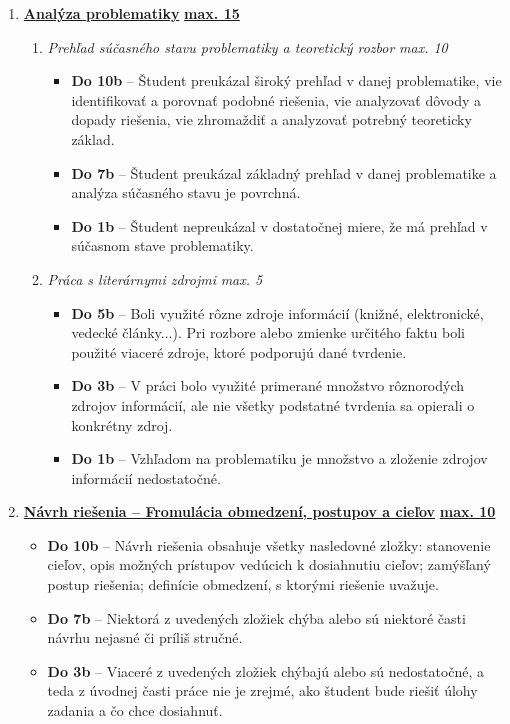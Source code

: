 \begin{enumerate}[label=\textbf{\arabic*.}]
    \item \underline{\textbf{Analýza problematiky}} \hfill \underline{\textbf{max. 15}}
    
    \begin{enumerate}
        \item \textit{Prehľad súčasného stavu problematiky a teoretický rozbor} \hfill \textit{max. 10}
        \begin{itemize}
            \item \textbf{Do 10b} – Študent preukázal široký prehľad v danej problematike, vie identifikovať a porovnať  podobné riešenia, vie analyzovať dôvody a dopady riešenia, vie zhromaždiť a analyzovať potrebný teoreticky základ.  
            \item \textbf{Do 7b} – Študent preukázal základný prehľad v danej problematike a analýza súčasného stavu je povrchná. 
            \item \textbf{Do 1b} – Študent nepreukázal v dostatočnej miere, že má prehľad v súčasnom stave problematiky. 
        \end{itemize}
        
        \item \textit{Práca s literárnymi zdrojmi} \hfill \textit{max. 5}
        \begin{itemize}
            \item \textbf{Do 5b} – Boli využité rôzne zdroje informácií (knižné, elektronické, vedecké články...). Pri rozbore alebo zmienke určitého faktu boli použité viaceré zdroje, ktoré podporujú dané tvrdenie. 
            \item \textbf{Do 3b} – V práci bolo využité primerané množstvo rôznorodých zdrojov informácií, ale nie všetky podstatné tvrdenia sa opierali o konkrétny zdroj. 
            \item \textbf{Do 1b} – Vzhľadom na problematiku je množstvo a zloženie zdrojov informácií nedostatočné. 
        \end{itemize}
    \end{enumerate}

    \item \underline{\textbf{Návrh riešenia – Fromulácia obmedzení, postupov a cieľov}} \hfill \underline{\textbf{max. 10}}
    \begin{itemize}
        \item \textbf{Do 10b} – Návrh riešenia obsahuje všetky nasledovné zložky: stanovenie cieľov, opis možných prístupov vedúcich k dosiahnutiu cieľov; zamýšľaný postup riešenia; definície obmedzení, s ktorými riešenie uvažuje. 
        \item \textbf{Do 7b} – Niektorá z uvedených zložiek chýba alebo sú niektoré časti návrhu nejasné či príliš stručné. 
        \item \textbf{Do 3b} – Viaceré z uvedených zložiek chýbajú alebo sú nedostatočné, a teda z úvodnej časti práce nie je zrejmé, ako študent bude riešiť úlohy zadania a čo chce dosiahnuť. 
    \end{itemize}


\end{enumerate}
